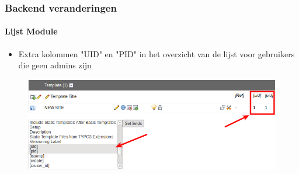
\begin{frame}[fragile]
	\frametitle{Backend veranderingen}
	\framesubtitle{Lijst Module}

	\begin{itemize}
		\item Extra kolommen "UID" en "PID" in het overzicht van de lijst voor gebruikers die geen admins zijn
	\end{itemize}

	\begin{figure}
		\includegraphics[width=0.95\linewidth]{Images/BackendChanges/AdditionalColumnsInListModule.png}
	\end{figure}

\end{frame}


